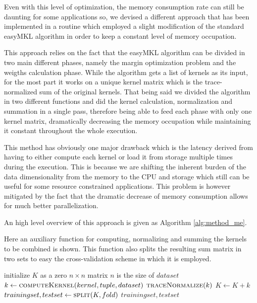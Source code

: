 Even with this level of optimization, the memory consumption rate can still be
daunting for some applications so, we devised a different approach that has been
implemented in a routine which employed a slight modification of the standard
easyMKL algorithm \cite{easymkl} in order to keep a constant level of memory
occupation.

This approach relies on the fact that the easyMKL algorithm can be divided in two
main different phases, namely the margin optimization problem and the weigths
calculation phase.
While the algorithm gets a list of kernels as its input, for the most part
it works on a unique kernel matrix which is the trace-normalized sum of the 
original kernels.
That being said we divided the algorithm in two different functions and did
the kernel calculation, normalization and summation in a single pass, therefore
being able to feed each phase with only one kernel matrix, dramatically decreasing
the memory occupation while maintaining it constant throughout the whole execution.

This method has obviously one major drawback which is the latency derived from
having to either compute each kernel or load it from storage multiple times
during the execution.
This is because we are shifting the inherent burden of the data dimensionality
from the memory to the CPU and storage which still can be useful for some resource
constrained applications.
This problem is however mitigated by the fact that the dramatic decrease of memory
consumption allows for much better parallelization.

An high level overview of this approach is given as Algorithm \ref{alg:method_me}.

\begin{algorithm}
    \caption{
        Here an auxiliary function for computing, normalizing and summing the
        kernels to be combined is shown.
        This function also splits the resulting sum matrix in two sets to
        easy the cross-validation scheme in which it is employed.
    }
    \label{alg:compute_sum}
    \begin{algorithmic}[1]
            \State initialize $K$ as a zero $n\times n$ matrix
            \Comment $n$ is the size of $dataset$
                    \State $k \gets \Call{computeKernel}{kernel, tuple, dataset}$
                    \State $\Call{traceNormalize}{k}$
                    \State $K \gets K+k$
                \EndFor
            \EndFor
            \State $trainingset, testset \gets \Call{split}{K,fold}$
            \State \Return $trainingset, testset$
        \EndFunction
    \end{algorithmic}
\end{algorithm}

